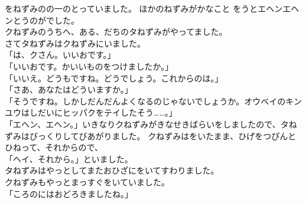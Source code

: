 \documentclass[
    a4paper,
    10pt,
    book]
    {tarticle}
\begin{document}
をねずみのの一のとっていました。
ほかのねずみがかなこと
をうとエヘンエヘンとうのがでした。\\
\indent クねずみのうちへ、ある、だちのタねずみがやってました。\\
\indent さてタねずみはクねずみにいました。\\
「は、クさん。いいおです。」\\
「いいおです。かいいものをつけましたか。」\\
「いいえ。どうもですね。どうでしょう。これからのは。」\\
「さあ、あなたはどういますか。」\\
「そうですね。しかしだんだんよくなるのじゃないでしょうか。オウベイのキンユウはしだいにヒッパクをテイしたそう……。」\\
「エヘン、エヘン。」いきなりクねずみがきなせきばらいをしましたので、タねずみはびっくりしてびあがりました。
クねずみはをいたまま、ひげをつぴんとひねって、それからので、\\
「ヘイ、それから。」といました。\\
\indent タねずみはやっとしてまたおひざにをいてすわりました。\\
\indent クねずみもやっとまっすぐをいていました。\\
「ころのにはおどろきましたね。」

\newpage
\thispagestyle{fancy}
\end{document}
